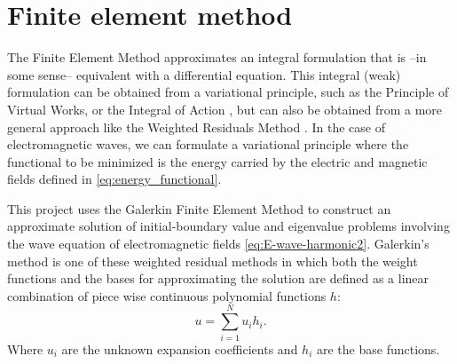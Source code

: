 \chapter{Finite element method}
\label{ch:Finite_element_method}

%
%
%
%
%
%
%
%

The Finite Element Method approximates an integral formulation that is --in some sense-- equivalent with a differential equation. This integral (weak) formulation can be obtained from a variational principle, such as the Principle of Virtual Works, or the Integral of Action \cite{Goldstein2001}, but can also be obtained from a more general approach like the Weighted Residuals Method \cite{Zienkiewicz2005, Reddy_functional_analysis}. In the case of electromagnetic waves, we can formulate a variational principle where the functional to be minimized is the energy carried by the electric and magnetic fields defined in \ref{eq:energy_functional}. 

This project uses the Galerkin Finite Element Method to construct an approximate solution of  initial-boundary value and eigenvalue problems involving the wave equation of electromagnetic fields \ref{eq:E-wave-harmonic2}. Galerkin's method is one of these weighted residual methods in which both the weight functions and the bases for approximating the solution are defined as a linear combination of piece wise continuous polynomial functions $h$: $$u = \sum_{i=1}^Nu_ih_i.$$ Where $u_i$ are the unknown expansion coefficients and $h_i$ are the base functions. 


